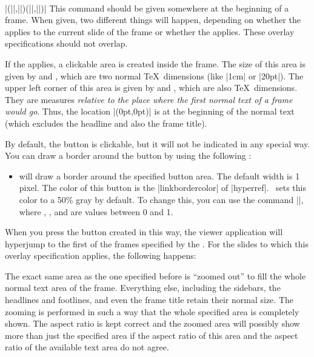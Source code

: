 \begin{command}{\framezoom{}\\|(||,||)(||,||)|}
  This command should be given somewhere at the beginning of a frame. When given, two different things will happen, depending on whether the  applies to the current slide of the frame or whether the  applies. These overlay specifications should not overlap.

  If the  applies, a clickable area is created inside the frame. The size of this area is given by  and , which are two normal \TeX\ dimensions (like |1cm| or |20pt|). The upper left corner of this area is given by  and , which are also \TeX\ dimensions. They are measures \emph{relative to the place where the first normal text of a frame would go}. Thus, the location |(0pt,0pt)| is at the beginning of the normal text (which excludes the headline and also the frame title).

  By default, the button is clickable, but it will not be indicated in any special way. You can draw a border around the button by using the following :
  \begin{itemize}
  \item
     will draw a border around the specified button area. The default width is 1 pixel. The color of this  button is the |linkbordercolor| of |hyperref|. \beamer\ sets this color to a 50\% gray by default. To change this, you can use the command ||, where , , and  are values between 0 and 1.
  \end{itemize}

  When you press the button created in this way, the viewer application will hyperjump to the first of the frames specified by the . For the slides to which this overlay specification applies, the following happens:

  The exact same area as the one specified before is ``zoomed out'' to fill the whole normal text area of the frame. Everything else, including the sidebars, the headlines and footlines, and even the frame title retain their normal size. The zooming is performed in such a way that the whole specified area is completely shown. The aspect ratio is kept correct and the zoomed area will possibly show more than just the specified area if the aspect ratio of this area and the aspect ratio of the available text area do not agree.


\end{command}
